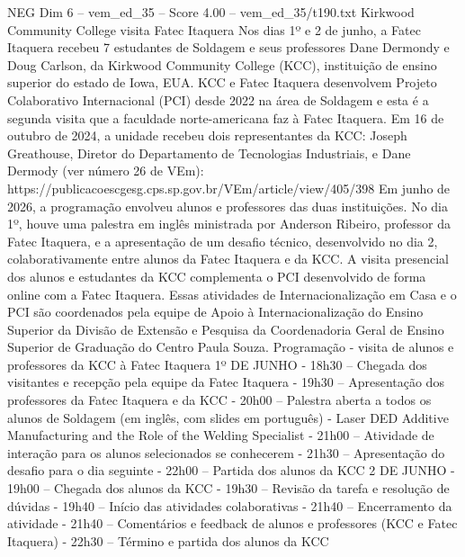 \begin{textsample}{NEG Dim 6 – vem\_ed\_35 – Score 4.00 – vem\_ed\_35/t190.txt}  \label{ex:f6_neg_011}
Kirkwood Community College visita Fatec Itaquera Nos dias 1º e 2 de junho, a Fatec Itaquera recebeu 7 estudantes de Soldagem e seus professores Dane Dermondy e Doug Carlson, da Kirkwood Community College (KCC), instituição de ensino superior do estado de Iowa, EUA.
KCC e Fatec Itaquera desenvolvem Projeto Colaborativo Internacional (PCI) desde 2022 na área de Soldagem e esta é a segunda visita que a faculdade norte-americana faz à Fatec Itaquera.
Em 16 de outubro de 2024, a unidade recebeu dois representantes da KCC: Joseph Greathouse, Diretor do Departamento de Tecnologias Industriais, e Dane Dermody (ver número 26 de VEm): https://publicacoescgesg.cps.sp.gov.br/VEm/article/view/405/398 Em junho de 2026, a programação envolveu alunos e professores das duas instituições.
No dia 1º, houve uma palestra em inglês ministrada por Anderson Ribeiro, professor da Fatec Itaquera, e a apresentação de um desafio técnico, desenvolvido no dia 2, colaborativamente entre alunos da Fatec Itaquera e da KCC.
A visita presencial dos alunos e estudantes da KCC complementa o PCI desenvolvido de forma online com a Fatec Itaquera.
Essas atividades de Internacionalização em Casa e o PCI são coordenados pela equipe de Apoio à Internacionalização do Ensino Superior da Divisão de Extensão e Pesquisa da Coordenadoria Geral de Ensino Superior de Graduação do Centro Paula Souza.
Programação - visita de alunos e professores da KCC à Fatec Itaquera 1º DE JUNHO - 18h30 – Chegada dos visitantes e recepção pela equipe da Fatec Itaquera - 19h30 – Apresentação dos professores da Fatec Itaquera e da KCC - 20h00 – Palestra aberta a todos os alunos de Soldagem (em inglês, com slides em português) - Laser DED Additive Manufacturing and the Role of the Welding Specialist - 21h00 – Atividade de interação para os alunos selecionados se conhecerem - 21h30 – Apresentação do desafio para o dia seguinte - 22h00 – Partida dos alunos da KCC 2 DE JUNHO - 19h00 – Chegada dos alunos da KCC - 19h30 – Revisão da tarefa e resolução de dúvidas - 19h40 – Início das atividades colaborativas - 21h40 – Encerramento da atividade - 21h40 – Comentários e feedback de alunos e professores (KCC e Fatec Itaquera) - 22h30 – Término e partida dos alunos da KCC

\end{textsample}
